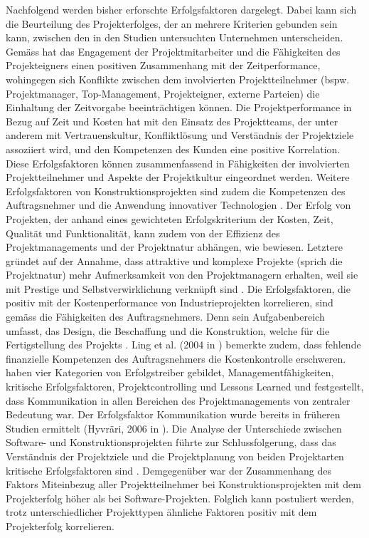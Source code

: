 Nachfolgend werden bisher erforschte Erfolgsfaktoren dargelegt. Dabei kann sich die Beurteilung des Projekterfolges, der an mehrere Kriterien gebunden sein kann, zwischen den in den Studien untersuchten Unternehmen unterscheiden. Gemäss \citealp{iyerjha06} hat das Engagement der Projektmitarbeiter und die Fähigkeiten des Projekteigners einen positiven Zusammenhang mit der Zeitperformance, wohingegen sich Konflikte zwischen dem involvierten Projektteilnehmer (bspw. Projektmanager, Top-Management, Projekteigner, externe Parteien) die Einhaltung der Zeitvorgabe beeinträchtigen können. Die Projektperformance in Bezug auf Zeit und Kosten hat mit den Einsatz des Projektteams, der unter anderem mit Vertrauenskultur, Konfliktlösung und Verständnis der Projektziele assoziiert wird, und den Kompetenzen des Kunden eine positive Korrelation\citep{chahota01}. Diese Erfolgsfaktoren können zusammenfassend in Fähigkeiten der involvierten Projektteilnehmer und Aspekte der Projektkultur eingeordnet werden. Weitere Erfolgsfaktoren von Konstruktionsprojekten sind zudem die Kompetenzen des Auftragsnehmer und die Anwendung innovativer Technologien \citep{chahota01}. Der Erfolg von Projekten, der anhand eines gewichteten Erfolgskriterium der Kosten, Zeit, Qualität und Funktionalität, kann zudem von der Effizienz des Projektmanagements und der Projektnatur abhängen, wie \citealp{lchch08} bewiesen. Letztere gründet auf der Annahme, dass attraktive und komplexe Projekte (sprich die Projektnatur) mehr Aufmerksamkeit von den Projektmanagern erhalten, weil sie mit Prestige und Selbstverwirklichung verknüpft sind \citep{lchch08}. Die Erfolgsfaktoren, die positiv mit der Kostenperformance von Industrieprojekten korrelieren, sind gemäss \citealp{luhuazha17} die Fähigkeiten des Auftragsnehmers. Denn sein Aufgabenbereich umfasst, das Design, die Beschaffung und die Konstruktion, welche für die Fertigstellung des Projekts \citep{luhuazha17}. Ling et al. (2004 in \citealp{luhuazha17}) bemerkte zudem, dass fehlende finanzielle Kompetenzen des Auftragsnehmers die Kostenkontrolle erschweren.
\newline \citealp{BeDeNov2015} haben vier Kategorien von Erfolgstreiber gebildet, Managementfähigkeiten, kritische Erfolgsfaktoren, Projektcontrolling und \glqq Lessons Learned \grqq { } und festgestellt, dass Kommunikation in allen Bereichen des Projektmanagements von zentraler Bedeutung war. Der Erfolgsfaktor Kommunikation wurde bereits in früheren Studien ermittelt (Hyvräri, 2006 in \citealp{BeDeNov2015}). Die Analyse der Unterschiede zwischen Software- und Konstruktionsprojekten führte zur Schlussfolgerung, dass das Verständnis der Projektziele und die Projektplanung von beiden Projektarten kritische Erfolgsfaktoren sind \citep{VarDom14}. Demgegenüber war der Zusammenhang des Faktors \glqq Miteinbezug aller Projektteilnehmer \grqq { } bei Konstruktionsprojekten mit dem Projekterfolg höher als bei Software-Projekten. Folglich kann postuliert werden, trotz unterschiedlicher Projekttypen ähnliche Faktoren positiv mit dem Projekterfolg korrelieren.
